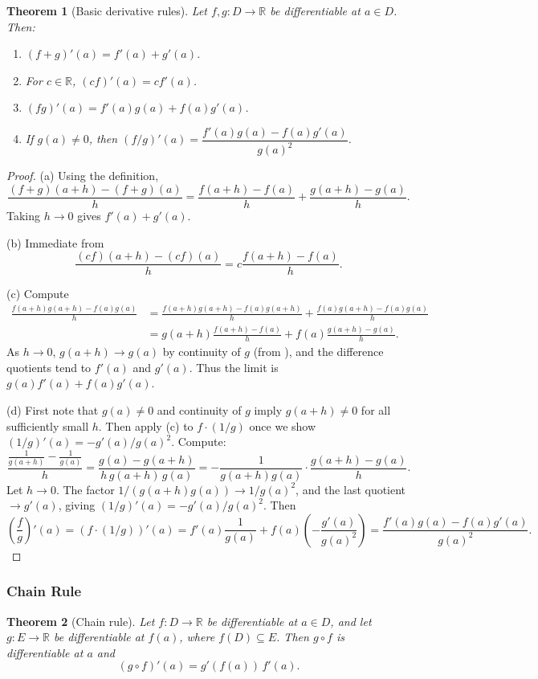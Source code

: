 \documentclass[12pt]{article}
\numberwithin{equation}{section}
\newcommand{\RR}{\mathbb{R}}
\theoremstyle{plain}
\newtheorem{theorem}{Theorem}[section]
\theoremstyle{definition}
\theoremstyle{remark}
\begin{document}
\begin{theorem}[Basic derivative rules]\label{thm:basic-deriv-rules}
Let $f,g:D\to\RR$ be differentiable at $a\in D$.
Then:
\begin{enumerate}[label=(\alph*)]
\item $(f+g)'(a)=f'(a)+g'(a)$.
\item For $c\in\RR$, $(cf)'(a)=c f'(a)$.
\item $(fg)'(a)=f'(a)g(a)+f(a)g'(a)$.
\item If $g(a)\neq 0$, then $(f/g)'(a)=\dfrac{f'(a)g(a)-f(a)g'(a)}{g(a)^2}$.
\end{enumerate}
\end{theorem}

\begin{proof}
(a) Using the definition,
\[
\frac{(f+g)(a+h)-(f+g)(a)}{h}
=
\frac{f(a+h)-f(a)}{h}+\frac{g(a+h)-g(a)}{h}.
\]
Taking $h\to 0$ gives $f'(a)+g'(a)$.

(b) Immediate from
\[
\frac{(cf)(a+h)-(cf)(a)}{h}=c\frac{f(a+h)-f(a)}{h}.
\]

(c) Compute
\begin{align*}
\frac{f(a+h)g(a+h)-f(a)g(a)}{h}
&=\frac{f(a+h)g(a+h)-f(a)g(a+h)}{h}
 +\frac{f(a)g(a+h)-f(a)g(a)}{h}\\
&=g(a+h)\frac{f(a+h)-f(a)}{h}+f(a)\frac{g(a+h)-g(a)}{h}.
\end{align*}
As $h\to 0$, $g(a+h)\to g(a)$ by continuity of $g$ (from ),
and the difference quotients tend to $f'(a)$ and $g'(a)$.
Thus the limit is $g(a)f'(a)+f(a)g'(a)$.

(d) First note that $g(a)\neq 0$ and continuity of $g$ imply $g(a+h)\neq 0$ for all sufficiently small $h$.
Then apply (c) to $f\cdot (1/g)$ once we show $(1/g)'(a)=-g'(a)/g(a)^2$.
Compute:
\[
\frac{\frac{1}{g(a+h)}-\frac{1}{g(a)}}{h}
=
\frac{g(a)-g(a+h)}{h\,g(a+h)\,g(a)}
=
-\frac{1}{g(a+h)g(a)}\cdot \frac{g(a+h)-g(a)}{h}.
\]
Let $h\to 0$. The factor $1/(g(a+h)g(a))\to 1/g(a)^2$, and the last quotient $\to g'(a)$,
giving $(1/g)'(a)=-g'(a)/g(a)^2$.
Then
\[
\left(\frac{f}{g}\right)'(a)=(f\cdot (1/g))'(a)=f'(a)\frac{1}{g(a)}+f(a)\left(-\frac{g'(a)}{g(a)^2}\right)
=\frac{f'(a)g(a)-f(a)g'(a)}{g(a)^2}.
\]
\end{proof}

\subsubsection{Chain Rule}

\begin{theorem}[Chain rule]\label{thm:chain-rule}
Let $f:D\to\RR$ be differentiable at $a\in D$, and let $g:E\to\RR$ be differentiable at $f(a)$, where $f(D)\subseteq E$.
Then $g\circ f$ is differentiable at $a$ and
\[
(g\circ f)'(a)=g'(f(a))\,f'(a).
\]
\end{theorem}
\end{document}
